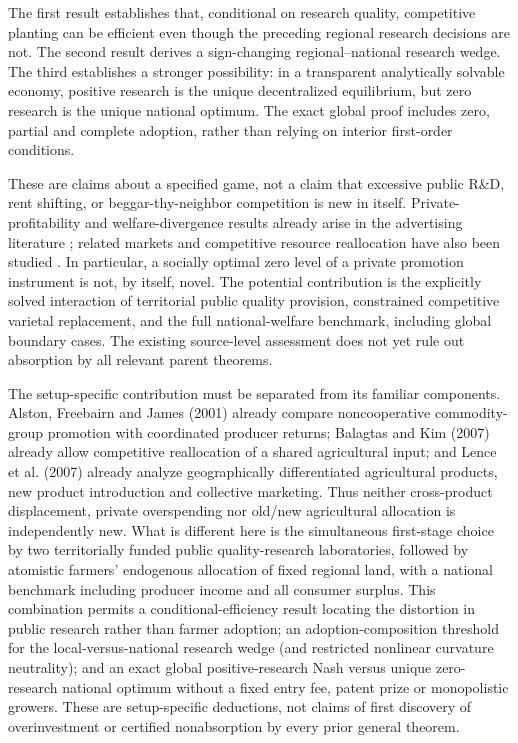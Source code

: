 \documentclass[11pt]{article}
\begin{document}
The first result establishes that, conditional on research quality, competitive planting can be efficient even though the preceding regional research decisions are not. The second result derives a sign-changing regional--national research wedge. The third establishes a stronger possibility: in a transparent analytically solvable economy, positive research is the unique decentralized equilibrium, but zero research is the unique national optimum. The exact global proof includes zero, partial and complete adoption, rather than relying on interior first-order conditions.

These are claims about a specified game, not a claim that excessive public R\&D, rent shifting, or beggar-thy-neighbor competition is new in itself. Private-profitability and welfare-divergence results already arise in the advertising literature \citep{dixit1978advertising,alston2001beggar,cardon2003market}; related markets and competitive resource reallocation have also been studied \citep{kinnucan2000distributional,balagtas2007dairy,lence2007collective}. In particular, a socially optimal zero level of a private promotion instrument is not, by itself, novel. The potential contribution is the explicitly solved interaction of territorial public quality provision, constrained competitive varietal replacement, and the full national-welfare benchmark, including global boundary cases. The existing source-level assessment does not yet rule out absorption by all relevant parent theorems.

The setup-specific contribution must be separated from its familiar components. Alston, Freebairn and James (2001) already compare noncooperative commodity-group promotion with coordinated producer returns; Balagtas and Kim (2007) already allow competitive reallocation of a shared agricultural input; and Lence et al. (2007) already analyze geographically differentiated agricultural products, new product introduction and collective marketing. Thus neither cross-product displacement, private overspending nor old/new agricultural allocation is independently new. What is different here is the simultaneous first-stage choice by two territorially funded public quality-research laboratories, followed by atomistic farmers' endogenous allocation of fixed regional land, with a national benchmark including producer income and all consumer surplus. This combination permits a conditional-efficiency result locating the distortion in public research rather than farmer adoption; an adoption-composition threshold for the local-versus-national research wedge (and restricted nonlinear curvature neutrality); and an exact global positive-research Nash versus unique zero-research national optimum without a fixed entry fee, patent prize or monopolistic growers. These are setup-specific deductions, not claims of first discovery of overinvestment or certified nonabsorption by every prior general theorem.
\end{document}
